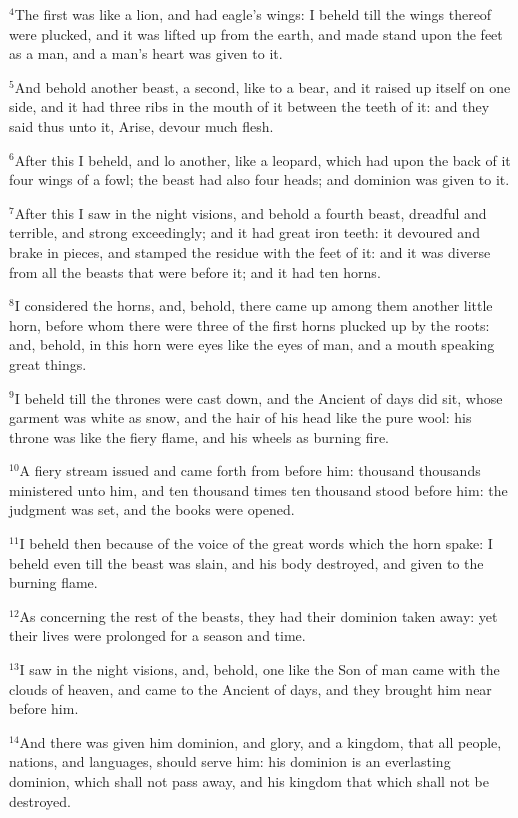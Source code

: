 \documentclass[12pt]{article}
\begin{document}
$^{4}$The first was like a lion, and had eagle's wings: I beheld till
the wings thereof were plucked, and it was lifted up from the earth,
and made stand upon the feet as a man, and a man's heart was given to
it.


$^{5}$And behold another beast, a second, like to a bear, and it raised
up itself on one side, and it had three ribs in the mouth of it
between the teeth of it: and they said thus unto it, Arise, devour
much flesh.


$^{6}$After this I beheld, and lo another, like a leopard, which had
upon the back of it four wings of a fowl; the beast had also four
heads; and dominion was given to it.


$^{7}$After this I saw in the night visions, and behold a fourth beast,
dreadful and terrible, and strong exceedingly; and it had great iron
teeth: it devoured and brake in pieces, and stamped the residue with
the feet of it: and it was diverse from all the beasts that were
before it; and it had ten horns.


$^{8}$I considered the horns, and, behold, there came up among them
another little horn, before whom there were three of the first horns
plucked up by the roots: and, behold, in this horn were eyes like the
eyes of man, and a mouth speaking great things.


$^{9}$I beheld till the thrones were cast down, and the Ancient of days
did sit, whose garment was white as snow, and the hair of his head
like the pure wool: his throne was like the fiery flame, and his
wheels as burning fire.


$^{10}$A fiery stream issued and came forth from before him: thousand
thousands ministered unto him, and ten thousand times ten thousand
stood before him: the judgment was set, and the books were opened.


$^{11}$I beheld then because of the voice of the great words which the
horn spake: I beheld even till the beast was slain, and his body
destroyed, and given to the burning flame.


$^{12}$As concerning the rest of the beasts, they had their dominion
taken away: yet their lives were prolonged for a season and time.


$^{13}$I saw in the night visions, and, behold, one like the Son of man
came with the clouds of heaven, and came to the Ancient of days, and
they brought him near before him.


$^{14}$And there was given him dominion, and glory, and a kingdom, that
all people, nations, and languages, should serve him: his dominion is
an everlasting dominion, which shall not pass away, and his kingdom
that which shall not be destroyed.
\end{document}
